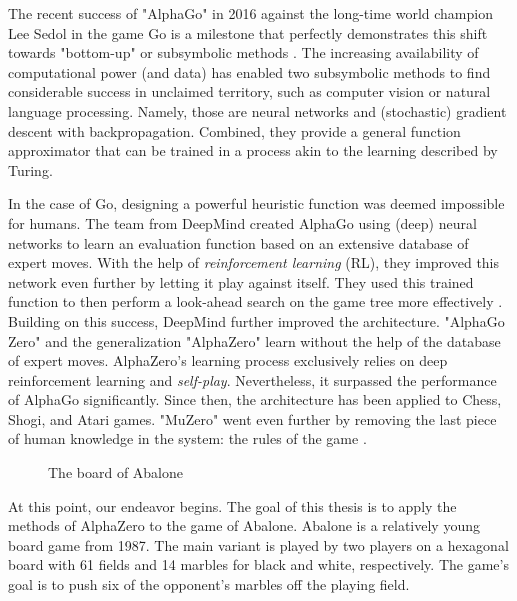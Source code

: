 The recent success of "AlphaGo" in 2016 against the long-time world champion Lee Sedol \cite{deepmind_match_nodate} in the game Go is a milestone that perfectly demonstrates this shift towards "bottom-up" or subsymbolic methods \cite{nilsson_artificial_1998}. The increasing availability of computational power (and data) has enabled two subsymbolic methods to find considerable success in unclaimed territory, such as computer vision or natural language processing. Namely, those are neural networks and (stochastic) gradient descent with backpropagation. Combined, they provide a general function approximator that can be trained in a process akin to the learning described by Turing.

In the case of Go, designing a powerful heuristic function was deemed impossible for humans. The team from DeepMind created AlphaGo using (deep) neural networks to learn an evaluation function based on an extensive database of expert moves. With the help of \textit{reinforcement learning} (RL), they improved this network even further by letting it play against itself. They used this trained function to then perform a look-ahead search on the game tree more effectively \cite{silver_mastering_2017}. Building on this success, DeepMind further improved the architecture. "AlphaGo Zero" and the generalization "AlphaZero" learn without the help of the database of expert moves. AlphaZero's learning process exclusively relies on deep reinforcement learning and \textit{self-play}.
Nevertheless, it surpassed the performance of AlphaGo significantly. Since then, the architecture has been applied to Chess, Shogi, and Atari games. "MuZero" went even further by removing the last piece of human knowledge in the system: the rules of the game \cite{schrittwieser_mastering_2020}.

\begin{figure}[H]
    \centering
    \caption{The board of Abalone}
    \label{abalone_boards}
\end{figure}


At this point, our endeavor begins. The goal of this thesis is to apply the methods of AlphaZero to the game of Abalone. Abalone is a relatively young board game from 1987. The main variant is played by two players on a hexagonal board with 61 fields and 14 marbles for black and white, respectively. The game's goal is to push six of the opponent's marbles off the playing field.

